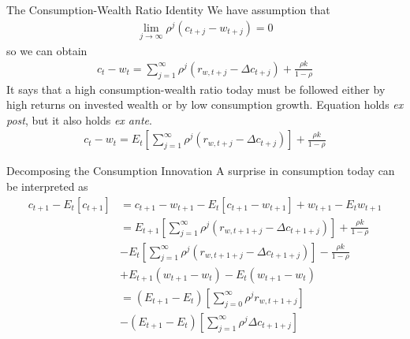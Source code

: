 \documentclass{beamer}
\begin{document}
\begin{frame}{The Consumption-Wealth Ratio Identity}
	We have assumption that
	\begin{align*}
		\lim _{j \rightarrow \infty} \rho^{j}\left(c_{t+j}-w_{t+j}\right)=0
	\end{align*}
	so we can obtain
	\begin{align}
		c_t - w_t = \sum_{j=1}^{\infty} \rho^{j}\left(r_{w, t+j}-\Delta c_{t+j}\right)+\frac{\rho k}{1-\rho}
	\end{align}
	It says that a high consumption-wealth ratio today must be followed either by high returns on invested wealth or by low consumption growth. Equation holds \textit{ex post}, but it also
	holds \textit{ex ante}.
	\begin{align}
		c_t - w_t = E_t \left[\sum_{j=1}^{\infty} \rho^{j}\left(r_{w, t+j}-\Delta c_{t+j}\right)\right] +\frac{\rho k}{1-\rho}\label{consumptionwealthratio}
	\end{align}

\end{frame}

\begin{frame}{Decomposing the Consumption Innovation}
	A surprise in consumption today can be interpreted as
	\begin{align}
		c_{t+1}-E_{t}\left[c_{t+1}\right] &=c_{t+1}-w_{t+1}-E_{t}\left[c_{t+1}-w_{t+1}\right]+w_{t+1} - E_{t} w_{t+1}\\
		&= E_{t+1} \left[\sum_{j=1}^{\infty} \rho^{j}\left(r_{w, t+1+j}-\Delta c_{t+1+j}\right)\right] +\frac{\rho k}{1-\rho}\\
		& - E_{t} \left[\sum_{j=1}^{\infty} \rho^{j}\left(r_{w, t+1+j}-\Delta c_{t+1+j}\right)\right] -\frac{\rho k}{1-\rho}\\
		&+E_{t+1}(w_{t+1} -w_t) - E_t \left( w_{t+1} -w_t \right) \\
		& = \left(E_{t+1} - E_t \right) \left[\sum_{j=0}^{\infty} \rho^{j} r_{w, t+1+j} \right]\\
		&-\left(E_{t+1} - E_t \right) \left[\sum_{j=1}^{\infty} \rho^{j} \Delta c_{t+1+j} \right]\label{consumption shock}
	\end{align}
\end{frame}
\end{document}
